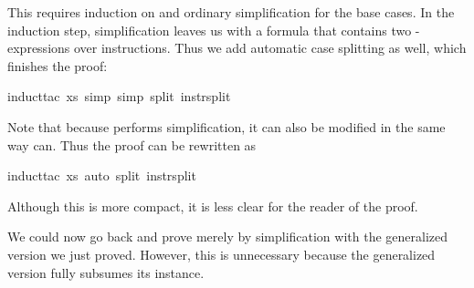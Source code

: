 \begin{isabellebody}
\begin{isamarkuptxt}%
\noindent
This requires induction on  and ordinary simplification for the
base cases. In the induction step, simplification leaves us with a formula
that contains two -expressions over instructions. Thus we add
automatic case splitting as well, which finishes the proof:%
\end{isamarkuptxt}%
induct{\isacharunderscore}tac\ xs{\isacharcomma}\ simp{\isacharcomma}\ simp\ split{\isacharcolon}\ instr{\isachardot}split{\isacharparenright}%
\begin{isamarkuptext}%
\noindent
Note that because  performs simplification, it can
also be modified in the same way  can. Thus the proof can be
rewritten as%
\end{isamarkuptext}%
induct{\isacharunderscore}tac\ xs{\isacharcomma}\ auto\ split{\isacharcolon}\ instr{\isachardot}split{\isacharparenright}%
\begin{isamarkuptext}%
\noindent
Although this is more compact, it is less clear for the reader of the proof.

We could now go back and prove 
merely by simplification with the generalized version we just proved.
However, this is unnecessary because the generalized version fully subsumes
its instance.%
\end{isamarkuptext}%
\end{isabellebody}%
